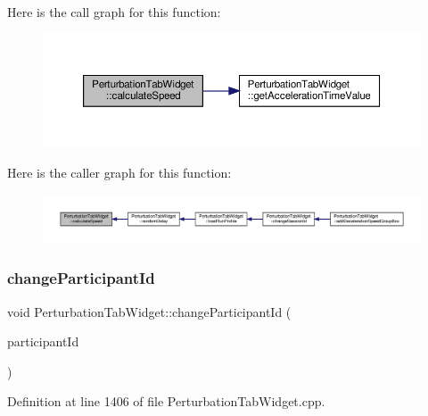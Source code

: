 Here is the call graph for this function\+:
\nopagebreak
\begin{figure}[H]
\begin{center}
\leavevmode
\includegraphics[width=350pt]{class_perturbation_tab_widget_aa79aeeb2da8075a4cd6ac6c08e0fb135_cgraph}
\end{center}
\end{figure}
Here is the caller graph for this function\+:
\nopagebreak
\begin{figure}[H]
\begin{center}
\leavevmode
\includegraphics[width=350pt]{class_perturbation_tab_widget_aa79aeeb2da8075a4cd6ac6c08e0fb135_icgraph}
\end{center}
\end{figure}
\mbox{\label{class_perturbation_tab_widget_a67b4c15cd26d35da1eb09559e2136502}} 
\subsubsection{\texorpdfstring{change\+Participant\+Id}{changeParticipantId}}
{\footnotesize\ttfamily void Perturbation\+Tab\+Widget\+::change\+Participant\+Id (\begin{DoxyParamCaption}\item[{Q\+String}]{participant\+Id }\end{DoxyParamCaption})\hspace{0.3cm}{\ttfamily [slot]}}



Definition at line 1406 of file Perturbation\+Tab\+Widget.\+cpp.

